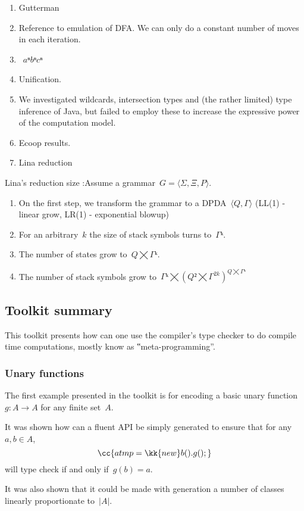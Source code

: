
\begin{enumerate}
  \item Gutterman
  \item Reference to emulation of DFA\@. We can only do
        a constant number of moves in each iteration.
  \item~$aⁿbⁿcⁿ$
  \item \Prolog Unification.
  \item We investigated wildcards, intersection types and
        (the rather limited) type inference of
        Java, but failed to employ these to increase the expressive power of the computation model.
  \item Ecoop results.
  \item Lina reduction
\end{enumerate}

Lina's reduction size :Assume a grammar~$G=⟨Σ,Ξ,P⟩$.
    \begin{enumerate}
      \item On the first step, we transform the grammar to a DPDA~$⟨Q,Γ⟩$ (LL(1) - linear grow, LR(1) - exponential blowup)
      \item For an arbitrary~$k$ the size of stack symbols turns to~$Γᵏ$.
      \item The number of states grow to~$Q⨉Γᵏ$.
      \item The number of stack symbols grow to~$Γᵏ⨉(Q²⨉Γ^{2k})^{Q⨉Γᵏ}$
    \end{enumerate}

\subsection{Toolkit summary}
This toolkit presents how can one use the \Java compiler's
  type checker to do compile time computations, mostly know as
  ‟meta-programming”.

\subsubsection*{Unary functions}
The first example presented in the toolkit is for encoding a
  basic unary function~$g:A→A$ for any finite set~$A$.

It was shown how can a fluent API be simply generated
  to ensure that for any~$a,b∈A$,
\[
  \cc{a tmp = \kk{new} b().g();}
\]
will type check if and only if~$g(b)=a$.

It was also shown that it could be made with generation
  a number of classes linearly proportionate to~$|A|$.

